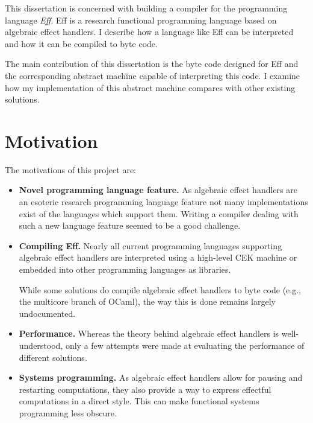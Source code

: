 \documentclass[class=article,crop=false,11pt]{standalone}
\begin{document}
This dissertation is concerned with building a compiler for the programming language \emph{Eff}.
Eff is a research functional programming language based on algebraic effect handlers.
I describe how a language like Eff can be interpreted and how it can be compiled to byte code.

The main contribution of this dissertation is the byte code designed for Eff and
the corresponding abstract machine capable of interpreting this code.
I examine how my implementation of this abstract machine compares with other existing solutions.

\section{Motivation}

The motivations of this project are:
\begin{itemize}
\item \textbf{Novel programming language feature.} 
As algebraic effect handlers are an esoteric research programming language feature not many
implementations exist of the languages which support them. Writing a compiler dealing with 
such a new language feature seemed to be a good challenge.


\item \textbf{Compiling Eff.}
Nearly all current programming languages supporting algebraic effect handlers are
interpreted using a high-level CEK machine or embedded into other programming languages
as libraries.

While some solutions do compile algebraic effect handlers to byte code
(e.g., the multicore branch of OCaml), the way this is done remains largely undocumented.

\item \textbf{Performance.}
Whereas the theory behind algebraic effect handlers is well-understood, only a
few attempts were made at evaluating the performance of different solutions.

\item \textbf{Systems programming.}
As algebraic effect handlers allow for pausing and restarting computations, they
also provide a way to express effectful computations in a direct style. This can make
functional systems programming less obscure.

\end{itemize}
\end{document}
